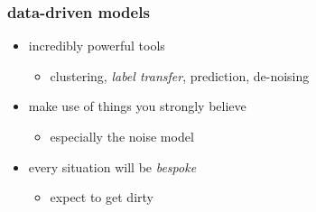 \documentclass[pdftex]{beamer}
\begin{document}
\begin{frame}
  \frametitle{data-driven models}
  \begin{itemize}
  \item incredibly powerful tools
    \begin{itemize}
    \item clustering, \emph{label transfer}, prediction, de-noising
    \end{itemize}
  \item make use of things you strongly believe
    \begin{itemize}
    \item especially the noise model
    \end{itemize}
  \item every situation will be \emph{bespoke}
    \begin{itemize}
    \item expect to get dirty
    \end{itemize}
  \end{itemize}
\end{frame}
\end{document}
